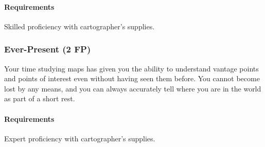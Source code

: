     \paragraph{Requirements} Skilled proficiency with cartographer's supplies.
\subsubsection{Ever-Present (2 FP)} \label{feat::everpresent}
    Your time studying maps has given you the ability to understand vantage points and points of interest even without having seen them before.
    You cannot become lost by any means, and you can always accurately tell where you are in the world as part of a short rest.
    \paragraph{Requirements} Expert proficiency with cartographer's supplies.

%

